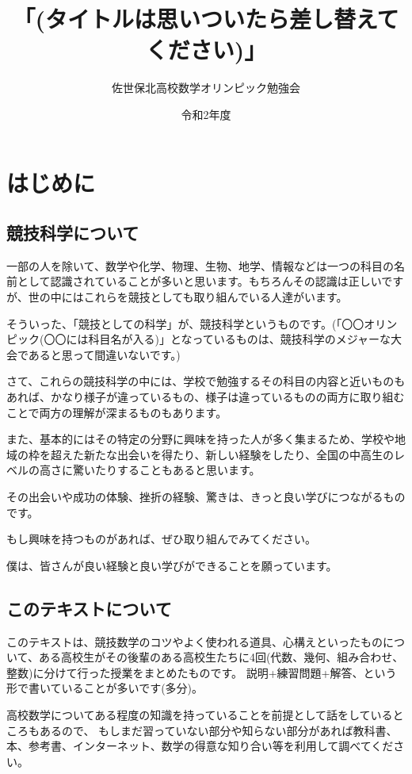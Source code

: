 \documentclass[uplatex,fleqn]{jsbook}
\begin{document}
\title{\HUGE 「(タイトルは思いついたら差し替えてください)」}
\author{\LARGE 佐世保北高校数学オリンピック勉強会}
\date{令和2年度}
\maketitle

\chapter{はじめに}
\section{競技科学について}
一部の人を除いて、数学や化学、物理、生物、地学、情報などは一つの科目の名前として認識されていることが多いと思います。もちろんその認識は正しいですが、世の中にはこれらを競技としても取り組んでいる人達がいます。

そういった、「競技としての科学」が、競技科学というものです。(「〇〇オリンピック(〇〇には科目名が入る)」となっているものは、競技科学のメジャーな大会であると思って間違いないです。)

さて、これらの競技科学の中には、学校で勉強するその科目の内容と近いものもあれば、かなり様子が違っているもの、様子は違っているものの両方に取り組むことで両方の理解が深まるものもあります。

また、基本的にはその特定の分野に興味を持った人が多く集まるため、学校や地域の枠を超えた新たな出会いを得たり、新しい経験をしたり、全国の中高生のレベルの高さに驚いたりすることもあると思います。

その出会いや成功の体験、挫折の経験、驚きは、きっと良い学びにつながるものです。

もし興味を持つものがあれば、ぜひ取り組んでみてください。

僕は、皆さんが良い経験と良い学びができることを願っています。

\section{このテキストについて}
このテキストは、競技数学のコツやよく使われる道具、心構えといったものについて、ある高校生がその後輩のある高校生たちに4回(代数、幾何、組み合わせ、整数)に分けて行った授業をまとめたものです。
説明+練習問題+解答、という形で書いていることが多いです(多分)。

高校数学についてある程度の知識を持っていることを前提として話をしているところもあるので、
もしまだ習っていない部分や知らない部分があれば教科書、本、参考書、インターネット、数学の得意な知り合い等を利用して調べてください。
\end{document}
